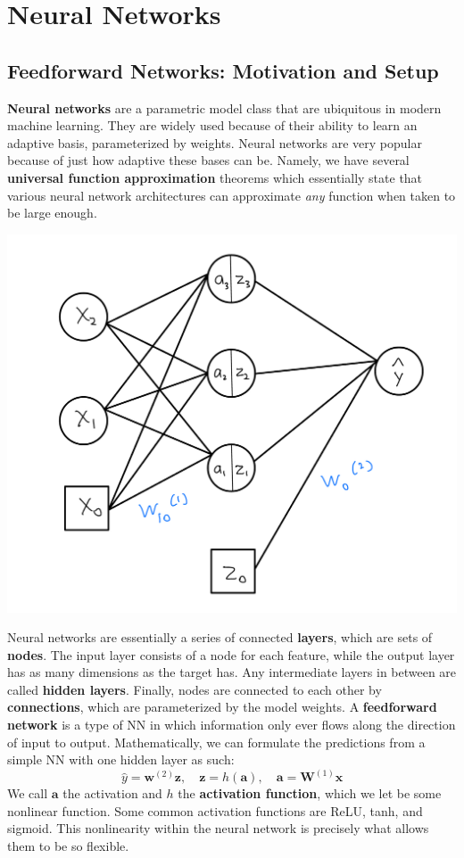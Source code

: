 \documentclass[11pt, letterpaper]{article}
\theoremstyle{definition}
\theoremstyle{plain}
\begin{document}
\section{Neural Networks}

\subsection{Feedforward Networks: Motivation and Setup}

\textbf{Neural networks} are a parametric model class that are ubiquitous in modern machine learning. They are widely used because of their ability to learn an adaptive basis, parameterized by weights. Neural networks are very popular because of just how adaptive these bases can be. Namely, we have several \textbf{universal function approximation} theorems which essentially state that various neural network architectures can approximate \textit{any} function when taken to be large enough. 

\begin{center}
    \includegraphics[scale=0.2]{img/nn_example.jpg}
\end{center}

Neural networks are essentially a series of connected \textbf{layers}, which are sets of \textbf{nodes}. The input layer consists of a node for each feature, while the output layer has as many dimensions as the target has. Any intermediate layers in between are called \textbf{hidden layers}. Finally, nodes are connected to each other by \textbf{connections}, which are parameterized by the model weights. A \textbf{feedforward network} is a type of NN in which information only ever flows along the direction of input to output. Mathematically, we can formulate the predictions from a simple NN with one hidden layer as such:
\[
\hat y = \bm w^{(2)}\bm z, \quad \bm z = h\left(\bm a\right), \quad \bm a = \bm{W}^{(1)}\bm x
\]
We call $\bm a$ the activation and $h$ the \textbf{activation function}, which we let be some nonlinear function. Some common activation functions are ReLU, tanh, and sigmoid. This nonlinearity within the neural network is precisely what allows them to be so flexible. 
\end{document}
